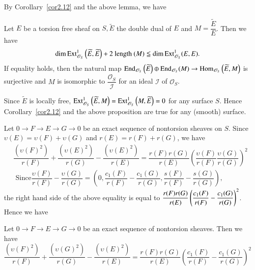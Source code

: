 By Corollary~\ref{cor2.12} and the above lemma, we have 

\begin{Prop}\label{Prop2.14}
Let $E$ be a torsion free sheaf on $S,\widetilde{E}$ the double dual
of $E$ and $M=\dfrac{\widetilde{E}}{E}$. Then we have 
$$
\dim \mathrm{Ext}^{1}_{\mathscr{O}_S}\left(\widetilde{E},\widetilde{E}\right)+2\text{
length }(M)\leqq \dim\mathrm{Ext}^{1}_{\mathscr{O}_S}(E,E).
$$
If equality holds, then the natural map
$\mathrm{End}_{\mathscr{O}_S}\left(\widetilde{E}\right)\oplus
\mathrm{End}_{\mathscr{O}_S}(M)\to \\\mathrm{Hom}_{\mathscr{O}_S}\left(\widetilde{E},M\right)$
is surjective and $M$ is isomorphic to
$\dfrac{\mathscr{O}_S}{\mathscr{I}}$ for an ideal $\mathscr{I}$ of
$\mathscr{O}_S$. 
\end{Prop}

\begin{remark}\label{remark2.15}
Since $\widetilde{E}$ is locally free,
$\mathrm{Ext}^{1}_{\mathscr{O}_S}\left(\widetilde{E},M\right)=\mathrm{Ext}^{1}_{\mathscr{O}_S}\left(M,\widetilde{E}\right)=0$
for any surface $S$. Hence Corollary~\ref{cor2.12} and the above
proposition are true for any (smooth) surface. 

Let $0\to F\to E\to G\to 0$ be an exact sequence of nontorsion sheaves
on $S$. Since $\upsilon(E)=\upsilon(F)+\upsilon(G)$ and
$r(E)=r(F)+r(G)$, we have 
$$
\begin{aligned}
&\dfrac{\left(\upsilon(F)^{2}\right)}{r(F)}+\dfrac{\left(\upsilon(E)^{2}\right)}{r(G)}-\dfrac{\left(\upsilon(E)^{2}\right)}{r(E)}=\dfrac{r(F)r(G)}{r(E)}\left(\dfrac{\upsilon(F)}{r(F)}\dfrac{\upsilon(G)}{r(G)}\right)^{2}\\
&{}\text{ Since
} \dfrac{\upsilon(F)}{r(F)}-\dfrac{\upsilon(G)}{r(G)}=\left(0,\dfrac{c_1(F)}{r(F)}-\dfrac{c_1(G)}{r(G)},\dfrac{s(F)}{r(F)}-\dfrac{s(G)}{r(G)}\right), 
\end{aligned}
$$\pageoriginale
the right hand side of the above equality is equal to
$\dfrac{r(F)r(G)}{r(E)}\\\left(\dfrac{c_1(F)}{r(F)}-\dfrac{c_1(G)}{r(G)}\right)^{2}$. Hence
we have 
\end{remark}

\begin{Prop}\label{Prop2.16}
Let $0\to F\to E\to G\to 0$ be an exact sequence of nontorsion
sheaves. Then we have 
$$
\dfrac{\left(\upsilon(F)^{2}\right)}{r(F)}+\dfrac{\left(\upsilon(G)^{2}\right)}{r(G)}-\dfrac{\left(\upsilon(E)^{2}\right)
}{r(E)}=\dfrac{r(F)r(G)}{r(E)}\left(\dfrac{c_1(F)}{r(F)}-\dfrac{c_1(G)}{r(G)}\right)^{2}
$$
\end{Prop}

